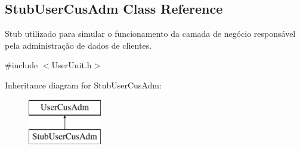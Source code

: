 \hypertarget{classStubUserCusAdm}{\subsection{Stub\-User\-Cus\-Adm Class Reference}
\label{d1/d9d/classStubUserCusAdm}
}


Stub utilizado para simular o funcionamento da camada de negócio responsável pela administração de dados de clientes.  




{\ttfamily \#include $<$User\-Unit.\-h$>$}

Inheritance diagram for Stub\-User\-Cus\-Adm\-:\begin{figure}[H]
\begin{center}
\leavevmode
\includegraphics[height=2.000000cm]{d1/d9d/classStubUserCusAdm}
\end{center}
\end{figure}
